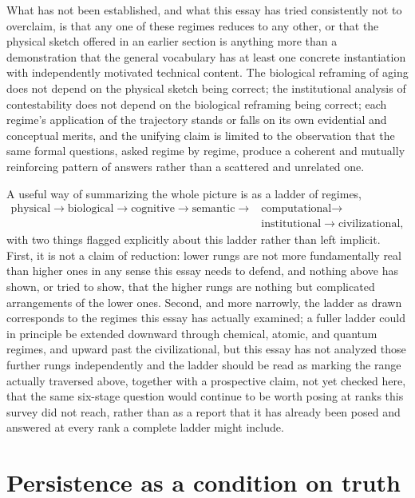 \documentclass[11pt]{article}
\begin{document}
What has not been established, and what this essay has tried consistently not to overclaim, is that any one of these regimes reduces to any other, or that the physical sketch offered in an earlier section is anything more than a demonstration that the general vocabulary has at least one concrete instantiation with independently motivated technical content. The biological reframing of aging does not depend on the physical sketch being correct; the institutional analysis of contestability does not depend on the biological reframing being correct; each regime's application of the trajectory stands or falls on its own evidential and conceptual merits, and the unifying claim is limited to the observation that the same formal questions, asked regime by regime, produce a coherent and mutually reinforcing pattern of answers rather than a scattered and unrelated one.

A useful way of summarizing the whole picture is as a ladder of regimes,
\begin{align*}
\text{physical} \to \text{biological} \to \text{cognitive} \to \text{semantic} \to{} & \text{computational} \to{} \\
& \text{institutional} \to \text{civilizational},
\end{align*}
with two things flagged explicitly about this ladder rather than left implicit. First, it is not a claim of reduction: lower rungs are not more fundamentally real than higher ones in any sense this essay needs to defend, and nothing above has shown, or tried to show, that the higher rungs are nothing but complicated arrangements of the lower ones. Second, and more narrowly, the ladder as drawn corresponds to the regimes this essay has actually examined; a fuller ladder could in principle be extended downward through chemical, atomic, and quantum regimes, and upward past the civilizational, but this essay has not analyzed those further rungs independently and the ladder should be read as marking the range actually traversed above, together with a prospective claim, not yet checked here, that the same six-stage question would continue to be worth posing at ranks this survey did not reach, rather than as a report that it has already been posed and answered at every rank a complete ladder might include.

\section{Persistence as a condition on truth}
\end{document}
